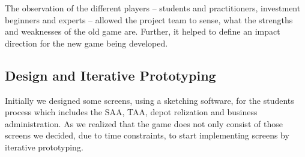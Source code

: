 The observation of the different players – students and practitioners, investment beginners and experts – allowed the project team to sense, what the strengths and weaknesses of the old game are. Further, it helped to define an impact direction for the new game being developed.


\subsection{Design and Iterative Prototyping}
Initially we designed some screens, using a sketching software, for the students process which includes the SAA, TAA, depot relization and business administration. As we realized that the game does not only consist of those screens we decided, due to time constraints, to start implementing screens by iterative prototyping.
